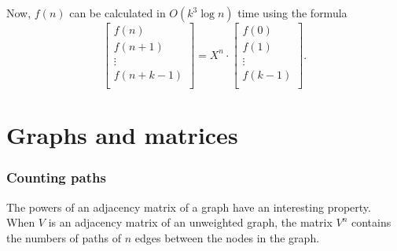 \begin{samepage}
    Now, $f(n)$ can be calculated in
    $O(k^3 \log n)$ time using the formula
    \[
        \begin{bmatrix}
            f(n)     \\
            f(n+1)   \\
            \vdots   \\
            f(n+k-1) \\
        \end{bmatrix}
        =
        X^n \cdot
        \begin{bmatrix}
            f(0)   \\
            f(1)   \\
            \vdots \\
            f(k-1) \\
        \end{bmatrix}.
    \]
\end{samepage}

\section{Graphs and matrices}

\subsubsection{Counting paths}

The powers of an adjacency matrix of a graph
have an interesting property.
When $V$ is an adjacency matrix of an unweighted graph,
the matrix $V^n$ contains the numbers of paths of
$n$ edges between the nodes in the graph.

